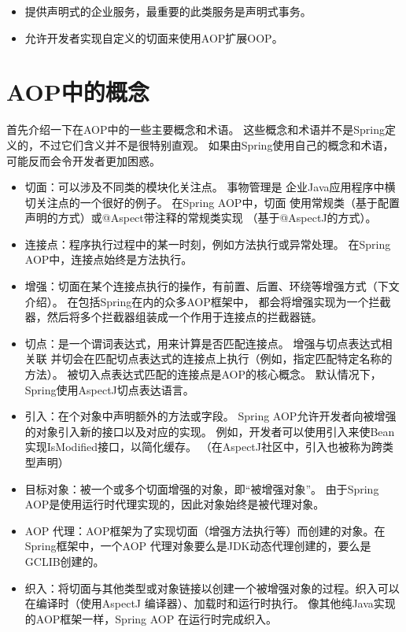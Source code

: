 \begin{itemize}
    \item 提供声明式的企业服务，最重要的此类服务是声明式事务。
    \item 允许开发者实现自定义的切面来使用AOP扩展OOP。
\end{itemize}

\section{AOP中的概念}
首先介绍一下在AOP中的一些主要概念和术语。
这些概念和术语并不是Spring定义的，不过它们含义并不是很特别直观。
如果由Spring使用自己的概念和术语，可能反而会令开发者更加困惑。

\begin{itemize}
    \item 切面：可以涉及不同类的模块化关注点。 事物管理是
    企业Java应用程序中横切关注点的一个很好的例子。 在Spring AOP中，切面
    使用常规类（基于配置声明的方式）或@Aspect带注释的常规类实现
    （基于@AspectJ的方式）。
    \item 连接点：程序执行过程中的某一时刻，例如方法执行或异常处理。
     在Spring AOP中，连接点始终是方法执行。
    \item 增强：切面在某个连接点执行的操作，有前置、后置、环绕等增强方式（下文介绍）。
    在包括Spring在内的众多AOP框架中，
    都会将增强实现为一个拦截器，然后将多个拦截器组装成一个作用于连接点的拦截器链。
    \item 切点：是一个谓词表达式，用来计算是否匹配连接点。
    增强与切点表达式相关联
    并切会在匹配切点表达式的连接点上执行（例如，指定匹配特定名称的方法）。
    被切入点表达式匹配的连接点是AOP的核心概念。
    默认情况下，Spring使用AspectJ切点表达语言。
    \item 引入：在个对象中声明额外的方法或字段。
    Spring AOP允许开发者向被增强的对象引入新的接口以及对应的实现。
    例如，开发者可以使用引入来使Bean实现IsModified接口，以简化缓存。
    （在AspectJ社区中，引入也被称为跨类型声明）
    \item 目标对象：被一个或多个切面增强的对象，即“被增强对象”。
    由于Spring AOP是使用运行时代理实现的，因此对象始终是被代理对象。
    \item AOP 代理：AOP框架为了实现切面（增强方法执行等）而创建的对象。在Spring框架中，一个AOP 代理对象要么是JDK动态代理创建的，要么是GCLIB创建的。
    \item 织入：将切面与其他类型或对象链接以创建一个被增强对象的过程。织入可以在编译时（使用AspectJ 编译器）、加载时和运行时执行。
    像其他纯Java实现的AOP框架一样，Spring AOP 在运行时完成织入。
\end{itemize}

